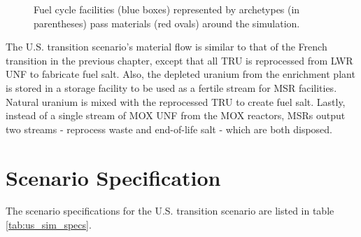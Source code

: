 \begin{figure}
{
		
	}
	\caption{Fuel cycle facilities (blue boxes) represented by 
		\Cyclus archetypes (in parentheses) pass materials (red 
		ovals) around the simulation.} 
	\label{diag:us_fc}
\end{figure}

The U.S. transition scenario's material flow is similar to that of the French transition
in the previous chapter,
except that all \gls{TRU} is reprocessed from \gls{LWR} \gls{UNF}
to fabricate fuel salt. Also, the depleted uranium from
the enrichment plant is stored in a storage facility to be used as a fertile stream for \gls{MSR} facilities.
Natural uranium is mixed with the reprocessed \gls{TRU} to create fuel salt.
Lastly, instead of a single
stream of \gls{MOX} \gls{UNF} from the \gls{MOX} reactors, \glspl{MSR}
output two streams - reprocess waste and end-of-life salt - which are both disposed.

\FloatBarrier


\section{Scenario Specification}

The scenario specifications for the U.S. transition scenario are listed
in table \ref{tab:us_sim_specs}.

